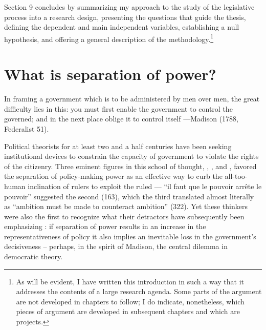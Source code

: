 Section 9 concludes by summarizing my approach to the study of the legislative process into a research design, presenting the questions that guide the thesis, defining the dependent and main independent variables, establishing a null hypothesis, and offering a general description of the methodology.\footnote{As will be evident, I have written this introduction in such a way that it addresses the contents of a large research agenda.  Some parts of the argument are not developed in chapters to follow; I do indicate, nonetheless, which pieces of argument are developed in subsequent chapters and which are projects.}

\section{What is separation of power?}
\label{s:whatSOP}

In framing a government which is to be administered by men over men, 
the great difficulty lies in this: you must first enable the government to 
control the governed; and in the next place oblige it to control itself
—Madison (1788, Federalist 51). \nocite{madison.1788}

Political theorists for at least two and a half centuries have been seeking institutional devices to constrain the capacity of government to violate the rights of the citizenry.  Three eminent figures in this school of thought, \citet{locke.1690}, \citet{montesquieu.1748}, and \citet{madison.1788}, favored the separation of policy-making power as an effective way to curb the all-too-human inclination of rulers to exploit the ruled --- ``il faut que le pouvoir arr\^ete le pouvoir'' suggested the second (163), which the third translated almost literally as ``ambition must be made to counteract ambition'' (322).  Yet these thinkers were also the first to recognize what their detractors have subsequently been emphasizing \citep{bagehot.1867,wilson.1884,romero.1893}: if separation of power results in an increase in the representativeness of policy it also implies an inevitable loss in the government's decisiveness – perhaps, in the spirit of Madison, the central dilemma in democratic theory.  

